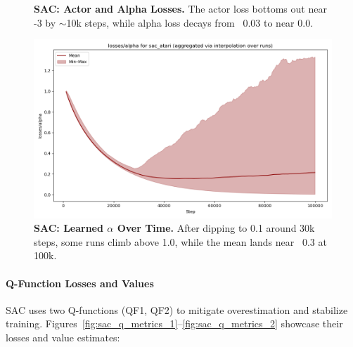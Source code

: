 \begin{figure}[htbp]
	\centering
	\quad
	\caption{\textbf{SAC: Actor and Alpha Losses.}
		The actor loss bottoms out near -3 by \(\sim\)10k steps, while alpha loss decays from ~0.03 to near 0.0.}
	\label{fig:sac_actor_alpha_losses}
\end{figure}

\begin{figure}[htbp]
	\centering
	\includegraphics[width=.5\textwidth]{figures/sac/losses_alpha_sac_atari.png}
	\caption{\textbf{SAC: Learned \(\alpha\) Over Time.}
		After dipping to 0.1 around 30k steps, some runs climb above 1.0, while the mean lands near ~0.3 at 100k.}
	\label{fig:sac_alpha}
\end{figure}

\paragraph{Q-Function Losses and Values}
SAC uses two Q-functions (QF1, QF2) to mitigate overestimation and stabilize training. Figures~\ref{fig:sac_q_metrics_1}--\ref{fig:sac_q_metrics_2} showcase their losses and value estimates:

